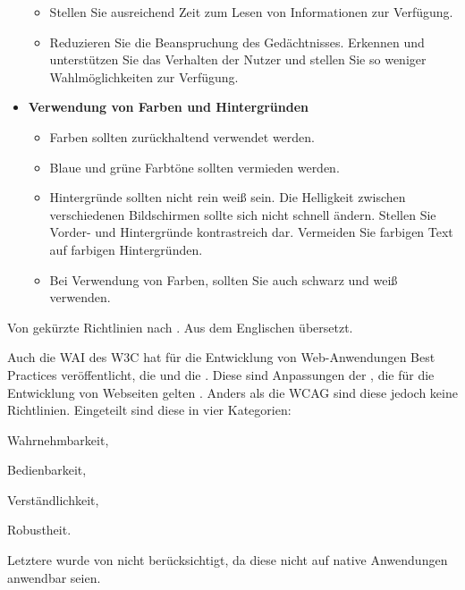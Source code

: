 \begin{table}[p]
\begin{itemize}[label={}]
		\begin{itemize}[nosep]
			\item Stellen Sie ausreichend Zeit zum Lesen von Informationen zur Verfügung.
			\item Reduzieren Sie die Beanspruchung des Gedächtnisses. Erkennen und unterstützen Sie das Verhalten der Nutzer und stellen Sie so weniger Wahlmöglichkeiten zur Verfügung.
		\end{itemize}
			\item \textbf{Verwendung von Farben und Hintergründen}
		\begin{itemize}[nosep]
			\item Farben sollten zurückhaltend verwendet werden.
			\item Blaue und grüne Farbtöne sollten vermieden werden.
			\item Hintergründe sollten nicht rein weiß sein. Die Helligkeit zwischen verschiedenen Bildschirmen sollte sich nicht schnell ändern. Stellen Sie Vorder- und Hintergründe kontrastreich dar. Vermeiden Sie farbigen Text auf farbigen Hintergründen.
			\item Bei Verwendung von Farben, sollten Sie auch schwarz und weiß verwenden.
		\end{itemize}
	\end{itemize}
	\caption{\label{tab:zaphiris-reduced-to-mobile}Von \textcite{Diaz-Bossini:2014:Accessibility-to-Mobile-Interfaces} gekürzte Richtlinien nach \textcite{Zaphiris:2005:Age-Centered-Research-Based-Web-Design}. Aus dem Englischen übersetzt.}
\end{table}

Auch die \ac{WAI} des \ac{W3C} hat für die Entwicklung von Web-Anwendungen Best Practices veröffentlicht, die  und die . Diese sind Anpassungen der , die für die Entwicklung von Webseiten gelten \cite{Web-Accessibility-Initiative::Older-Users-and-Web-Accessibility:}. Anders als die \ac{WCAG} sind diese jedoch keine Richtlinien.
Eingeteilt sind diese in vier Kategorien:
\begin{enumerate*}[label=(\arabic*)]
	\item Wahrnehmbarkeit,
	\item Bedienbarkeit,
	\item Verständlichkeit,
	\item Robustheit.
\end{enumerate*}
Letztere wurde von \citeauthor{Diaz-Bossini:2014:Accessibility-to-Mobile-Interfaces} nicht berücksichtigt, da diese nicht auf native Anwendungen anwendbar seien.

